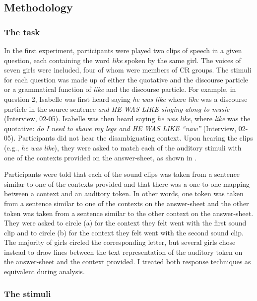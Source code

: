 \subsection{Methodology}

\subsubsection{The task}

In the first experiment, participants were played two clips of speech in a given question, each containing the word \textit{like} spoken by the same girl. The voices of seven girls were included, four of whom were members of CR groups. The stimuli for each question was made up of either the quotative and the discourse particle or a grammatical function of \textit{like} and the discourse particle. For example, in question 2, Isabelle was first heard saying \textit{he was like} where \textit{like} was a discourse particle in the source sentence \textit{and HE WAS LIKE singing along to music} (Interview, 02-05). Isabelle was then heard saying \textit{he was like}, where \textit{like} was the quotative: \textit{do I need to shave my legs and HE WAS LIKE ``naw''} (Interview, 02-05). Participants did not hear the disambiguating context. Upon hearing the clips (e.g., \textit{he was like}), they were asked to match each of the auditory stimuli with one of the contexts provided on the answer-sheet, as shown in . 



Participants were told that each of the sound clips was taken from a sentence similar to one of the contexts provided and that there was a one-to-one mapping between a context and an auditory token. In other words, one token was taken from a sentence similar to one of the contexts on the answer-sheet and the other token was taken from a sentence similar to the other context on the answer-sheet. They were asked to circle (a) for the context they felt went with the first sound clip and to circle (b) for the context they felt went with the second sound clip. The majority of girls circled the corresponding letter, but several girls chose instead to draw lines between the text representation of the auditory token on the answer-sheet and the context provided. I treated both response techniques as equivalent during analysis.

\subsubsection{The stimuli}

